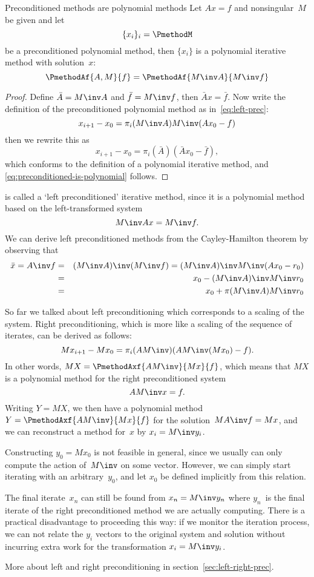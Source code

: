 \begin{precond}
\begin{llemma}{Preconditioned methods are polynomial methods}
Let $Ax=f$ and nonsingular~$M$ be given and let
    \[ \{x_i\}_i = \PmethodM \]
be a preconditioned polynomial method, then $\{x_i\}$
is a polynomial iterative method with solution~$x$:
\begin{equation}
        \PmethodAf{A,M}{f}=\PmethodAf{M\inv A}{M\inv f}
        \label{eq:preconditioned-is-polynomial}
\end{equation}
\end{llemma}
\begin{proof}
Define $\bar A=M\inv A$ and $\bar f=M\inv f$, then $\bar Ax=\bar f$.
Now write the definition of the preconditioned
polynomial method as in~\eqref{eq:left-prec}:
\[ x_{i+1}-x_0=\pi_i(M\inv A)M\inv (Ax_0-f) \]
then we rewrite this as \[ x_{i+1}-x_0=\pi_i(\bar A)(\bar Ax_0-\bar f), \]
which conforms to the definition of a polynomial iterative method,
and \eqref{eq:preconditioned-is-polynomial} follows.
\end{proof}

 is called a `left preconditioned' iterative
method, since it is a polynomial method based on the left-transformed
system \[M\inv Ax=M\inv f.\] We can derive left preconditioned methods
from the Cayley-Hamilton theorem by observing that
\begin{eqnarray*}
\bar x=A\inv f&=&(M\inv A)\inv(M\inv f)=(M\inv A)\inv
M\inv(Ax_0-r_0)\\
&=&x_0-(M\inv A)\inv M\inv r_0\\
&=&x_0+\pi(M\inv A)M\inv r_0
\end{eqnarray*}

\begin{truth}
So far we talked about left preconditioning which corresponds to a
scaling of the system.
Right preconditioning, which is more like a scaling of the sequence of
iterates, can be derived as follows:
\[ Mx_{i+1}-Mx_0=\pi_i(AM\inv)(AM\inv (Mx_0)-f). \]
In other words, $MX=\PmethodAxf{AM\inv}{Mx}{f}$, which means that
$MX$ is a polynomial method for the right preconditioned system
\[ AM\inv x=f.\]
Writing $Y=MX$, we then have a polynomial method $Y=\PmethodAxf{AM\inv}{Mx}{f}$
for the solution~$MA\inv f=Mx$, and we can
reconstruct a method for~$x$ by $x_i=M\inv y_i$.

Constructing $y_0=Mx_0$ is not feasible in general, since we usually
can only compute the action of~$M\inv$ on some vector. However, we can
simply start iterating with an arbitrary~$y_0$, and let $x_0$ be
defined implicitly from this relation. 

The final iterate~$x_n$ can still be
found from $x_n=M\inv y_n$ where $y_n$~is the final iterate of the
right preconditioned method we are actually computing. There is a
practical disadvantage to proceeding this way: if we monitor the
iteration process, we can not relate the $y_i$ vectors to the original
system and solution without incurring extra work for the
transformation $x_i=M\inv y_i$.

More about left and right preconditioning in
section~\ref{sec:left-right-prec}.
\end{truth}
\end{precond}

